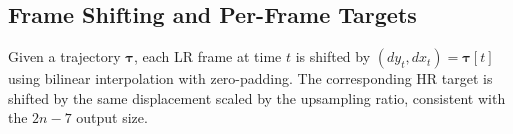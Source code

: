 
\subsection{Frame Shifting and Per-Frame Targets}
\label{sec:frame_shifting}

Given a trajectory $\boldsymbol{\tau}$, each LR frame at time $t$ is shifted by
$(dy_t, dx_t) = \boldsymbol{\tau}[t]$ using bilinear interpolation with zero-padding.
The corresponding HR target is shifted by the same displacement scaled by the
upsampling ratio, consistent with the
$2n-7$ output size.


